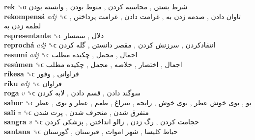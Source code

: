 \textbf{rek} ␝α   شرط بستن ,  محاسبه کردن ,  منوط بودن ,  وابسته بودن   \\
\textbf{rekompensá} \emph{adj}  ␝ϲ   تاوان دادن ,  صدمه زدن به ,  غرامت دادن ,  غرامت پرداختن ,  لطمه زدن به   \\
\textbf{representante} ␝ϲ   دلال ,  سمسار   \\
\textbf{reprochá} \emph{adj}  ␝ϲ   انتقادکردن ,  سرزنش کردن ,  مقصر دانستن ,  گله کردن   \\
\textbf{resumí} \emph{adj}  ␝ϲ   اجمال ,  مجمل ,  چکیده مطلب   \\
\textbf{resúmen} ␝ϲ   اجمال ,  اختصار ,  خلاصه ,  مجمل ,  چکیده مطلب   \\
\textbf{rikesa} ␝ϲ   فراوانی ,  وفور   \\
\textbf{riku} \emph{adj}  ␝ϲ   فراوان   \\
\textbf{roga} \emph{v}  ␝ϲ   سوگند دادن ,  قسم دادن ,  لابه کردن   \\
\textbf{sabor} ␝ϲ   بو ,  بوی خوش عطر ,  بوی خوش ,  رایحه ,  سراغ ,  طعم ,  عطر و بوی ,  عطر   \\
\textbf{sali} \emph{v}  ␝ϲ   متفرق شدن ,  منحرف شدن ,  پرت شدن   \\
\textbf{sangra} \emph{v}  ␝ϲ   حجامت کردن ,  رگ زدن ,  زالو انداختن ,  پزشکی کردن   \\
\textbf{santana} ␝ϲ   حیاط کلیسا ,  شهر اموات ,  قبرستان ,  گورستان   \\
